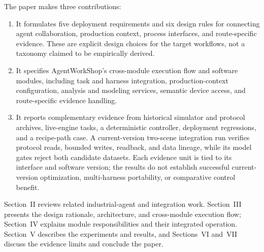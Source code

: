 The paper makes three contributions:
\begin{enumerate}
\item It formulates five deployment requirements and six design rules for
  connecting agent collaboration, production context, process interfaces, and
  route-specific evidence. These are explicit design choices for the target
  workflows, not a taxonomy claimed to be empirically derived.
\item It specifies AgentWorkShop's cross-module execution flow and software
  modules, including task and harness integration, production-context
  configuration, analysis and modeling services, semantic device access, and
  route-specific evidence handling.
\item It reports complementary evidence from historical simulator and
  protocol archives, live-engine tasks, a deterministic controller,
  deployment regressions, and a recipe-path case. A current-version
  two-scene integration run verifies protocol reads, bounded writes,
  readback, and data lineage, while its model gates reject both candidate
  datasets. Each evidence unit is tied to its interface and software
  version; the results do not establish successful current-version
  optimization, multi-harness portability, or comparative control benefit.
\end{enumerate}

Section~II reviews related industrial-agent and integration work.
Section~III presents the design rationale, architecture, and cross-module
execution flow; Section~IV explains module responsibilities and their
integrated operation. Section~V describes the experiments and results, and
Sections~VI and~VII discuss the evidence limits and conclude the paper.
